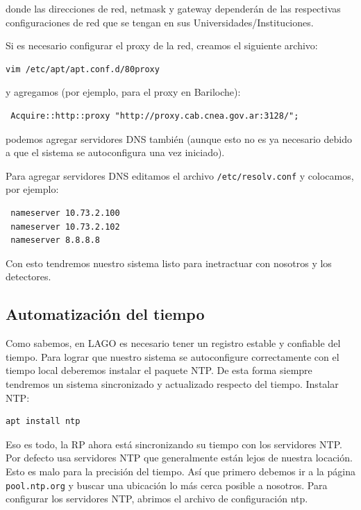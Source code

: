 \documentclass[a4paper,11pt]{article}
\begin{document}
\noindent donde las direcciones de red, netmask y gateway dependerán de las 
respectivas configuraciones de red que se tengan en sus
Universidades/Instituciones.

\noindent Si es necesario configurar el proxy de la red, creamos el siguiente archivo:

\begin{verbatim}
vim /etc/apt/apt.conf.d/80proxy
\end{verbatim}

\noindent y agregamos (por ejemplo, para el proxy en Bariloche):

\begin{verbatim}
 Acquire::http::proxy "http://proxy.cab.cnea.gov.ar:3128/";
\end{verbatim}

\noindent podemos agregar servidores DNS también (aunque esto no es ya necesario
debido a que el sistema se autoconfigura una vez iniciado). 

Para agregar servidores DNS editamos el archivo \texttt{/etc/resolv.conf} y
colocamos, por ejemplo:

\begin{verbatim}
 nameserver 10.73.2.100
 nameserver 10.73.2.102
 nameserver 8.8.8.8
\end{verbatim}

\noindent Con esto tendremos nuestro sistema listo para inetractuar con nosotros
y los detectores.

\subsection{Automatización del tiempo}
Como sabemos, en LAGO es necesario tener un registro estable y confiable del
tiempo. Para lograr que nuestro sistema se autoconfigure correctamente con el
tiempo local deberemos instalar el paquete NTP. De esta forma siempre tendremos
un sistema sincronizado y actualizado respecto del tiempo. Instalar NTP:

\begin{verbatim}
apt install ntp
\end{verbatim}

\noindent Eso es todo, la RP ahora está sincronizando su tiempo con los servidores NTP. Por
defecto usa servidores NTP que generalmente están lejos de nuestra locación.
Esto es malo para la precisión del tiempo. Así que primero debemos ir a la página
\texttt{pool.ntp.org} y buscar una ubicación lo más cerca posible a nosotros.
Para configurar los servidores NTP,
abrimos el archivo de configuración ntp.
\end{document}
